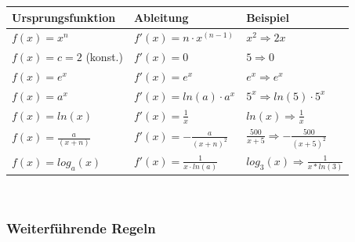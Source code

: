 \documentclass[12pt]{scrartcl}
\begin{document}
\renewcommand{\arraystretch}{1.5}
\begin{center}
    \begin{tabular}{ | m{10em} | m{10em} | m{10em} | }
        \hline
        Ursprungsfunktion & Ableitung & Beispiel \\ 
        \hline
        $f(x) = x^n$ & $f'(x) = n \cdot x^{(n-1)} $ & $x^2 \Rightarrow 2x$\\ 
        \hline
        $f(x) = c = 2$ (konst.) & $f'(x) = 0$ & $5 \Rightarrow 0$ \\
        \hline
        $f(x) = e^x$ & $f'(x) = e^x$ & $e^x \Rightarrow e^x$ \\
        \hline
        $f(x) = a^x$ & $f'(x) = ln(a) \cdot a^x$ & $5^x \Rightarrow ln(5) \cdot 5^x$ \\
        \hline
        $f(x) = ln(x)$ & $f'(x) = \frac{1}{x}$ & $ln(x) \Rightarrow \frac{1}{x}$ \\
        \hline 
        $f(x) = \frac{a}{(x + n)} $ & $ f'(x) = -\frac{a}{(x+n)^2} $ & $\frac{500}{x + 5} \Rightarrow -\frac{500}{(x+5)^2}$\\
        \hline 
        $f(x) = log_a(x) $ & $f'(x) = \frac{1}{x \cdot ln(a)}$ & $log_3(x) \Rightarrow \frac{1}{x * ln(3)}$ \\
        \hline 

    \end{tabular}
\end{center}

\hspace{0pt} \\

\subsubsection{Weiterführende Regeln}
\end{document}
